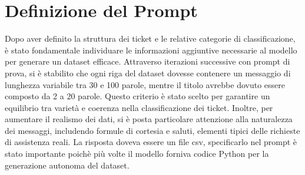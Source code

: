 \section{Definizione del Prompt}
Dopo aver definito la struttura dei ticket e le relative categorie di classificazione, è stato fondamentale individuare le informazioni aggiuntive necessarie al modello per generare un dataset efficace. Attraverso iterazioni successive con prompt di prova, si è stabilito che ogni riga del dataset dovesse contenere un messaggio di lunghezza variabile tra 30 e 100 parole, mentre il titolo avrebbe dovuto essere composto da 2 a 20 parole. Questo criterio è stato scelto per garantire un equilibrio tra varietà e coerenza nella classificazione dei ticket. Inoltre, per aumentare il realismo dei dati, si è posta particolare attenzione alla naturalezza dei messaggi, includendo formule di cortesia e saluti, elementi tipici delle richieste di assistenza reali. La risposta doveva essere un file csv, specificarlo nel prompt è stato importante poichè più volte il modello forniva codice Python per la generazione autonoma del dataset.

